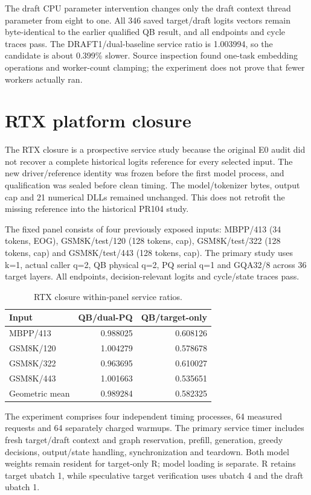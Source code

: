 The draft CPU parameter intervention changes only the draft context thread parameter from eight to one. All 346 saved target/draft logits vectors remain byte-identical to the earlier qualified QB result, and all endpoints and cycle traces pass. The DRAFT1/dual-baseline service ratio is 1.003994, so the candidate is about 0.399\% slower. Source inspection found one-task embedding operations and worker-count clamping; the experiment does not prove that fewer workers actually ran.

\section{RTX platform closure}
\label{app:rtxclosure}
The RTX closure is a prospective service study because the original E0 audit did not recover a complete historical logits reference for every selected input. The new driver/reference identity was frozen before the first model process, and qualification was sealed before clean timing. The model/tokenizer bytes, output cap and 21 numerical DLLs remained unchanged. This does not retrofit the missing reference into the historical PR104 study.

The fixed panel consists of four previously exposed inputs: MBPP/413 (34 tokens, EOG), GSM8K/test/120 (128 tokens, cap), GSM8K/test/322 (128 tokens, cap) and GSM8K/test/443 (128 tokens, cap). The primary study uses k=1, actual caller q=2, QB physical q=2, PQ serial q=1 and GQA32/8 across 36 target layers. All endpoints, decision-relevant logits and cycle/state traces pass.

\begin{table}[h]
\centering\small
\caption{RTX closure within-panel service ratios.}
\begin{tabular}{@{}lrr@{}}
\toprule
Input & QB/dual-PQ & QB/target-only \\
\midrule
MBPP/413 & 0.988025 & 0.608126 \\
GSM8K/120 & 1.004279 & 0.578678 \\
GSM8K/322 & 0.963695 & 0.610027 \\
GSM8K/443 & 1.001663 & 0.535651 \\
\midrule
Geometric mean & 0.989284 & 0.582325 \\
\bottomrule
\end{tabular}
\end{table}

The experiment comprises four independent timing processes, 64 measured requests and 64 separately charged warmups. The primary service timer includes fresh target/draft context and graph reservation, prefill, generation, greedy decisions, output/state handling, synchronization and teardown. Both model weights remain resident for target-only R; model loading is separate. R retains target ubatch 1, while speculative target verification uses ubatch 4 and the draft ubatch 1.

